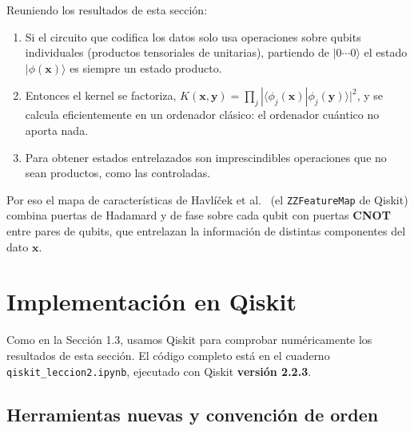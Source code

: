 \documentclass[11pt, a4paper, twoside, openright]{report}
\begin{document}
\begin{tcolorbox}[colback=teal!5!white,colframe=teal!75!black,title=\textbf{Conexión con el TFG: por qué el entrelazamiento importa en los kernels cuánticos}]
Reuniendo los resultados de esta sección:
\begin{enumerate}
    \item Si el circuito que codifica los datos solo usa operaciones sobre qubits individuales (productos tensoriales de unitarias), partiendo de $|0\cdots0\rangle$ el estado $|\phi(\mathbf{x})\rangle$ es siempre un estado producto.
    \item Entonces el kernel se factoriza, $K(\mathbf{x},\mathbf{y}) = \prod_j|\langle\phi_j(\mathbf{x})|\phi_j(\mathbf{y})\rangle|^2$, y se calcula eficientemente en un ordenador clásico: el ordenador cuántico no aporta nada.
    \item Para obtener estados entrelazados son imprescindibles operaciones que no sean productos, como las controladas.
\end{enumerate}
Por eso el mapa de características de Havlíček et al.\ \cite{havlicek2019supervised} (el \texttt{ZZFeatureMap} de Qiskit) combina puertas de Hadamard y de fase sobre cada qubit con puertas \textbf{CNOT} entre pares de qubits, que entrelazan la información de distintas componentes del dato $\mathbf{x}$.
\end{tcolorbox}

\cleardoublepage
\section{Implementación en Qiskit}

\noindent Como en la Sección 1.3, usamos Qiskit para comprobar numéricamente los resultados de esta sección. El código completo está en el cuaderno \texttt{qiskit\_leccion2.ipynb}, ejecutado con Qiskit \textbf{versión 2.2.3}.

\subsection{Herramientas nuevas y convención de orden}
\end{document}
